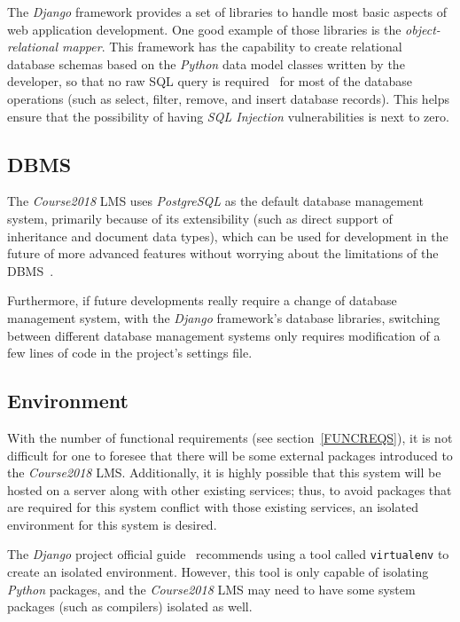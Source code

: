 The \emph{Django} framework provides a set of libraries to handle most basic
aspects of web application development. One good example of those libraries is
the \emph{object-relational mapper}. This framework has the capability to create
relational database schemas based on the \emph{Python} data model classes
written by the developer, so that no raw SQL query is required~\cite{django}
for most of the
database operations (such as select, filter, remove, and insert database
records).
This helps ensure that the possibility of having \emph{SQL Injection}
vulnerabilities is next to zero.

\subsection{DBMS}
The \emph{Course2018} LMS uses \emph{PostgreSQL} as the default database
management system, primarily because of its extensibility (such as direct
support of inheritance and document data types), which can be used for
development in the future of more advanced features without worrying about the
limitations of the DBMS~\cite{postgres}.

\medskip

Furthermore, if future developments really require a change of database
management system,
with the \emph{Django} framework's database libraries,
switching between different database management systems only requires
modification of a few lines of code in the project's settings file.

\subsection{Environment}
With the number of functional requirements (see section~\ref{FUNCREQS}), it is not difficult for
one to foresee that there will be some external packages introduced to the
\emph{Course2018} LMS.
Additionally, it is highly possible that this system will be hosted
on a server along with other existing services; thus, to avoid packages that
are required for this system conflict with those existing services, an
isolated environment for this system is desired.

\medskip
The \emph{Django} project official guide~\cite{djangoGuide} recommends using
a tool called \texttt{virtualenv} to create an isolated environment. However,
this tool is only capable of isolating \emph{Python} packages, and the
\emph{Course2018} LMS may need to have some system packages (such as
compilers) isolated as well.

